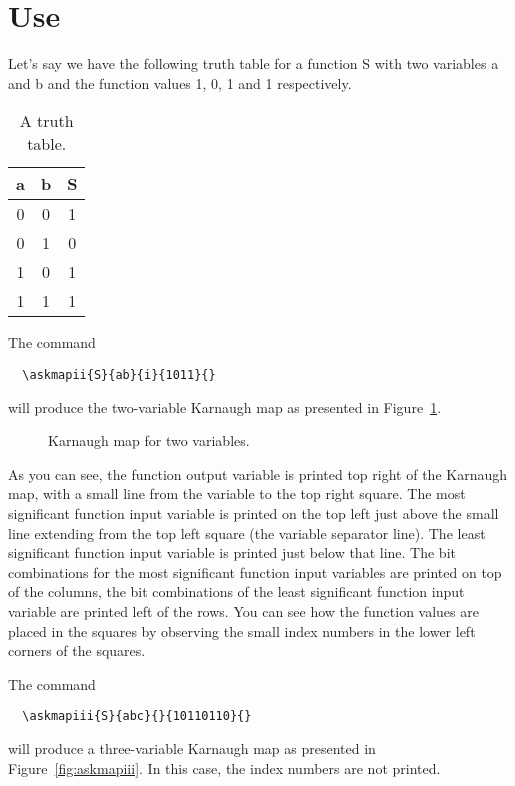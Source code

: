 \documentclass[a4paper,10pt]{ltxdoc}
\begin{document}
\section{Use}
\label{sec:use}
Let's say we have the following truth table for a function S with two variables
a and b and the function values 1, 0, 1 and 1 respectively.

\begin{table}[H]
\centering
\caption{A truth table.}
\begin{tabular}{cc|c}
a & b & S \\ \hline 
0 & 0 & 1 \\ 
0 & 1 & 0 \\ 
1 & 0 & 1 \\ 
1 & 1 & 1 \\ 
\end{tabular} 
\end{table}

The command
\begin{verbatim}
  \askmapii{S}{ab}{i}{1011}{}
\end{verbatim}
will produce the two-variable Karnaugh map as presented in
Figure~\ref{fig:askmapii}.
\begin{figure}[h]
\centering
\askmapunitlength=0.88cm
%
\caption{Karnaugh map for two variables.}
\label{fig:askmapii}
\end{figure}

As you can see, the function output variable is printed top right of the
Karnaugh map, with a small line from the variable to the top right square.
The most significant function input variable is printed on the top left just
above the small line extending from the top left square (the variable
separator line). The least significant
function input variable is printed just below that line. The bit combinations
for the most significant function input variables are printed on top of the
columns, the bit combinations of the least significant function input variable
are printed left of the rows. You can see how the function values are
placed in the squares by observing the small index numbers in the lower left
corners of the squares.
\medskip

The command 
\begin{verbatim}
  \askmapiii{S}{abc}{}{10110110}{}
\end{verbatim}
will produce a three-variable Karnaugh map as presented in
Figure~\ref{fig:askmapiii}. In this case, the index numbers are not printed.
\end{document}
